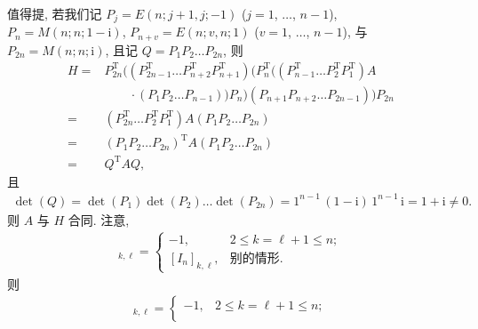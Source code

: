\documentclass[../libro.tex]{subfiles}
\begin{document}
\begin{example}
    值得提, 若我们记
    \(P_j = E(n; \allowbreak
            j+1, \allowbreak
            j; \allowbreak
    -1)\)
    (\(j = 1\), \(\dots\), \(n-1\)),
    \(P_n = M(n; \allowbreak
            n; \allowbreak
    1 - \mathrm{i})\),
    \(P_{n+v} = E(n; \allowbreak
            v, \allowbreak
            n; \allowbreak
    1)\)
    (\(v = 1\), \(\dots\), \(n-1\)),
    与 \(P_{2n} = M(n; \allowbreak
            n; \allowbreak
    \mathrm{i})\),
    且记 \(Q = P_1 P_2 \dots P_{2n}\),
    则
    \begin{align*}
        H
        = {} &
        P_{2n}^{\mathrm{T}}
        ((P_{2n-1}^{\mathrm{T}} \dots P_{n+2}^{\mathrm{T}} P_{n+1}^{\mathrm{T}})
            (P_n^{\mathrm{T}}
                ((P_{n-1}^{\mathrm{T}} \dots P_2^{\mathrm{T}} P_1^{\mathrm{T}})
                    A
                    \\
                    &
                    \quad \quad
                    \cdot
                (P_1 P_2 \dots P_{n-1}))
            P_n)
        (P_{n+1} P_{n+2} \dots P_{2n-1}))
        P_{2n}
        \\
        = {} &
        (P_{2n}^{\mathrm{T}} \dots P_2^{\mathrm{T}} P_1^{\mathrm{T}})
        A
        (P_1 P_2 \dots P_{2n})
        \\
        = {} &
        (P_1 P_2 \dots P_{2n})^{\mathrm{T}}
        A
        (P_1 P_2 \dots P_{2n})
        \\
        = {} &
        Q^{\mathrm{T}} A Q,
    \end{align*}
    且
    \begin{align*}
        \det {(Q)}
        = \det {(P_1)} \det {(P_2)} \dots \det {(P_{2n})}
        = 1^{n-1} \, (1 - \mathrm{i}) \, 1^{n-1} \, \mathrm{i}
        = 1 + \mathrm{i}
        \neq 0.
    \end{align*}
    则 \(A\) 与 \(H\) 合同.
    注意,
    \begin{align*}
        [P_1 P_2 \dots P_{n-1}]_{k,\ell} =
        \begin{cases}
            -1,             & 2 \leq k = \ell + 1 \leq n; \\
            [I_n]_{k,\ell}, & \text{别的情形}.
        \end{cases}
    \end{align*}
    则
    \begin{align*}
        [(P_1 P_2 \dots P_{n-1}) P_n]_{k,\ell} =
        \begin{cases}
            -1,             & 2 \leq k = \ell + 1 \leq n; \\

\end{cases}
\end{align*}
\end{example}
\end{document}

